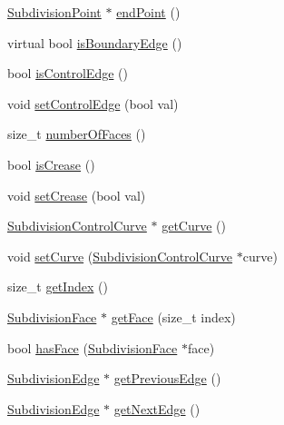 \begin{DoxyCompactItemize}
\hyperlink{classShipCAD_1_1SubdivisionPoint}{Subdivision\-Point} $\ast$ \hyperlink{classShipCAD_1_1SubdivisionEdge_a69acb7c9d026f05ea727fd80dc7ab6a0}{end\-Point} ()
\item 
virtual bool \hyperlink{classShipCAD_1_1SubdivisionEdge_ad95a3ec8ba66deb74cbfd3d36428fc34}{is\-Boundary\-Edge} ()
\item 
bool \hyperlink{classShipCAD_1_1SubdivisionEdge_a697962345138e27e520e3da8e3f2289a}{is\-Control\-Edge} ()
\item 
void \hyperlink{classShipCAD_1_1SubdivisionEdge_af48a9311daf8f3607e181922162e8c7b}{set\-Control\-Edge} (bool val)
\item 
size\-\_\-t \hyperlink{classShipCAD_1_1SubdivisionEdge_ae42291f7c6f7e6bdb647f27b8b0aa08e}{number\-Of\-Faces} ()
\item 
bool \hyperlink{classShipCAD_1_1SubdivisionEdge_a8bd402a4e395de86fb0095e72b91cfc4}{is\-Crease} ()
\item 
void \hyperlink{classShipCAD_1_1SubdivisionEdge_ad0313b8844a81c5802533376a09fce99}{set\-Crease} (bool val)
\item 
\hyperlink{classShipCAD_1_1SubdivisionControlCurve}{Subdivision\-Control\-Curve} $\ast$ \hyperlink{classShipCAD_1_1SubdivisionEdge_a659dd94b180681665d991db481a0cbc6}{get\-Curve} ()
\item 
void \hyperlink{classShipCAD_1_1SubdivisionEdge_a445c08836100060818c129ea7c694234}{set\-Curve} (\hyperlink{classShipCAD_1_1SubdivisionControlCurve}{Subdivision\-Control\-Curve} $\ast$curve)
\item 
size\-\_\-t \hyperlink{classShipCAD_1_1SubdivisionEdge_a4be990243bb29ead43c76171197130d5}{get\-Index} ()
\item 
\hyperlink{classShipCAD_1_1SubdivisionFace}{Subdivision\-Face} $\ast$ \hyperlink{classShipCAD_1_1SubdivisionEdge_a55dc9daab165567ed40e37f9e01ee766}{get\-Face} (size\-\_\-t index)
\item 
bool \hyperlink{classShipCAD_1_1SubdivisionEdge_a286bc4d7959703a153945e3bcb9c9ad3}{has\-Face} (\hyperlink{classShipCAD_1_1SubdivisionFace}{Subdivision\-Face} $\ast$face)
\item 
\hyperlink{classShipCAD_1_1SubdivisionEdge}{Subdivision\-Edge} $\ast$ \hyperlink{classShipCAD_1_1SubdivisionEdge_a7c1fe2cad6e7b8a0e532768b4a395137}{get\-Previous\-Edge} ()
\item 
\hyperlink{classShipCAD_1_1SubdivisionEdge}{Subdivision\-Edge} $\ast$ \hyperlink{classShipCAD_1_1SubdivisionEdge_aebb50514ff119a1484f7c7505a527a2b}{get\-Next\-Edge} ()
\item 

\end{DoxyCompactItemize}
